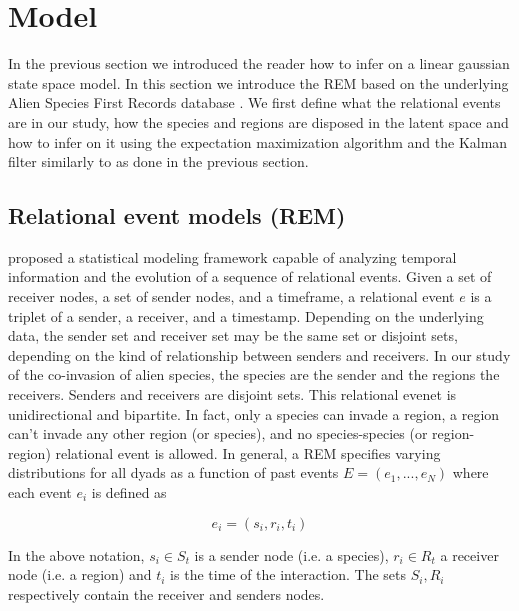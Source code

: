 \documentclass[mscthesis]{usiinfthesis}
\begin{document}
\chapter{Model}
In the previous section we introduced the reader how to infer on a linear gaussian state space model. In this section we introduce the REM based on the underlying Alien Species First Records database \cite{intro:dataset}. We first define what the relational events are in our study, how the species and regions are disposed in the latent space and how to infer on it using the expectation maximization algorithm and the Kalman filter similarly to as done in the previous section.

\section{Relational event models (REM)}
\label{model:rem}

\citet{rem:butts} proposed a statistical modeling framework capable of analyzing temporal information and the evolution of a sequence of relational events. Given a set of receiver nodes, a set of sender nodes, and a timeframe, a relational event $e$ is a triplet of a sender, a receiver, and a timestamp. Depending on the underlying data, the sender set and receiver set may be the same set or disjoint sets, depending on the kind of relationship between senders and receivers. In our study of the co-invasion of alien species, the species are the sender and the regions the receivers. Senders and receivers are disjoint sets. This relational evenet is unidirectional and bipartite. In fact, only a species can invade a region, a region can't invade any other region (or species), and no species-species (or region-region) relational event is allowed. In general, a REM specifies varying distributions for all dyads as a function of past events $E=(e_1, ..., e_N)$ where each event $e_i$ is defined as

\[
e_i = (s_i, r_i, t_i)
\]

In the above notation, $s_i \in S_{t} $ is a sender node (i.e. a species), $r_i \in R_{t}$ a receiver node (i.e. a region) and $t_i$ is the time of the interaction. The sets $S_i, R_i$ respectively contain the receiver and senders nodes.

%
\end{document}
